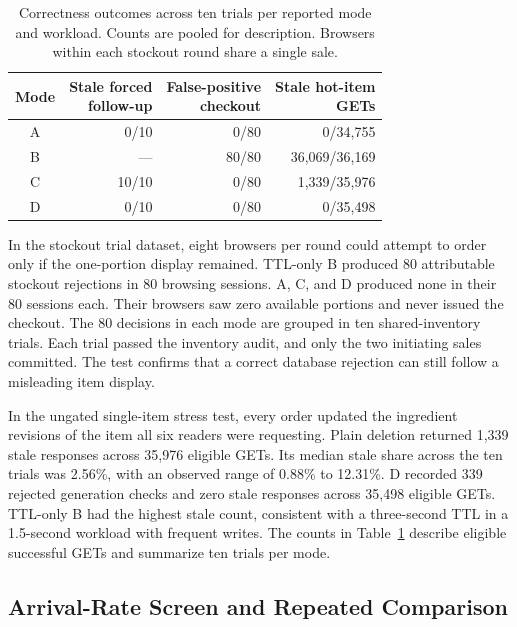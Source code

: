 \documentclass[conference]{IEEEtran}
\begin{document}
\begin{table}[t]
\centering
\caption{Correctness outcomes across ten trials per reported mode and workload. Counts are pooled for description. Browsers within each stockout round share a single sale.}
\label{tab:correctness}
\setlength{\tabcolsep}{4pt}
\begin{tabular}{@{}c r r r@{}}
\toprule
Mode & \shortstack{Stale forced\\follow-up} & \shortstack{False-positive\\checkout} & \shortstack{Stale hot-item\\GETs} \\
\midrule
A & 0/10 & 0/80 & 0/34,755 \\
B & --- & 80/80 & 36,069/36,169 \\
C & 10/10 & 0/80 & 1,339/35,976 \\
D & 0/10 & 0/80 & 0/35,498 \\
\bottomrule
\end{tabular}
\end{table}

In the stockout trial dataset, eight browsers per round could attempt to order only if the one-portion display remained. TTL-only B produced 80 attributable stockout rejections in 80 browsing sessions. A, C, and D produced none in their 80 sessions each. Their browsers saw zero available portions and never issued the checkout. The 80 decisions in each mode are grouped in ten shared-inventory trials. Each trial passed the inventory audit, and only the two initiating sales committed. The test confirms that a correct database rejection can still follow a misleading item display.

In the ungated single-item stress test, every order updated the ingredient revisions of the item all six readers were requesting. Plain deletion returned 1{,}339 stale responses across 35{,}976 eligible GETs. Its median stale share across the ten trials was 2.56\%, with an observed range of 0.88\% to 12.31\%. D recorded 339 rejected generation checks and zero stale responses across 35{,}498 eligible GETs. TTL-only B had the highest stale count, consistent with a three-second TTL in a 1.5-second workload with frequent writes. The counts in Table~\ref{tab:correctness} describe eligible successful GETs and summarize ten trials per mode.

\subsection{Arrival-Rate Screen and Repeated Comparison}
\end{document}
